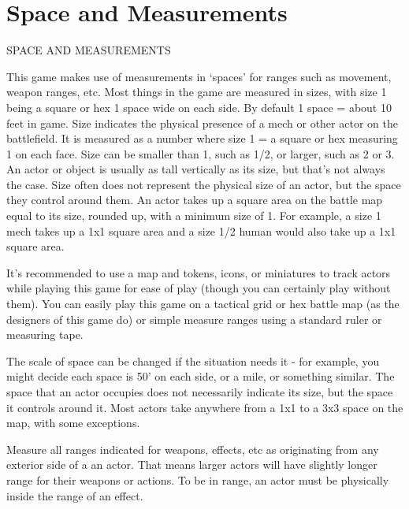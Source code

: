 \chapter{Space and Measurements}
                                 SPACE AND MEASUREMENTS

This game makes use of measurements in ‘spaces’ for ranges such as movement, weapon
ranges, etc. Most things in the game are measured in sizes, with size 1 being a square or hex 1
space wide on each side. By default 1 space = about 10 feet in game. Size indicates the physical
presence of a mech or other actor on the battlefield. It is measured as a number where size 1 = a
square or hex measuring 1 on each face. Size can be smaller than 1, such as 1/2, or larger, such
as 2 or 3. An actor or object is usually as tall vertically as its size, but that’s not always the case.
Size often does not represent the physical size of an actor, but the space they control around
them. An actor takes up a square area on the battle map equal to its size, rounded up, with a
minimum size of 1. For example, a size 1 mech takes up a 1x1 square area and a size 1/2 human
would also take up a 1x1 square area.

It’s recommended to use a map and tokens, icons, or miniatures to track actors while playing this
game for ease of play (though you can certainly play without them). You can easily play this game
on a tactical grid or hex battle map (as the designers of this game do) or simple measure ranges
using a standard ruler or measuring tape.

The scale of space can be changed if the situation needs it - for example, you might decide each
space is 50’ on each side, or a mile, or something similar. The space that an actor occupies does
not necessarily indicate its size, but the space it controls around it. Most actors take anywhere
from a 1x1 to a 3x3 space on the map, with some exceptions.


Measure all ranges indicated for weapons, effects, etc as originating from any exterior side of a
an actor. That means larger actors will have slightly longer range for their weapons or actions. To
be in range, an actor must be physically inside the range of an effect.